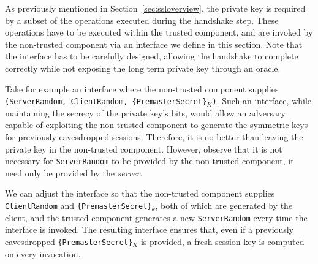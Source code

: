 \documentclass[../../main.tex]{subfiles}
\begin{document}
 As previously mentioned in
Section~\ref{sec:ssloverview}, the private key is required by a subset
of the operations executed during the handshake step. These operations
have to be executed within the trusted component, and are invoked by
the non-trusted component via an interface we define in this
section. Note that the interface has to be carefully designed,
allowing the handshake to complete correctly while not exposing the
long term private key through an oracle.

Take for example an interface where the non-trusted component supplies
\texttt{(ServerRandom, ClientRandom, \{PremasterSecret\}$_K$)}. Such
an interface, while maintaining the secrecy of the private key's bits,
would allow an adversary capable of exploiting the non-trusted
component to generate the symmetric keys for previously eavesdropped
sessions. Therefore, it is no better than leaving the private key in
the non-trusted component.  However, observe that it is not necessary
for \texttt{ServerRandom} to be provided by the non-trusted component,
it need only be provided by the \textit{server}.


We can adjust the interface so that the non-trusted component supplies
\texttt{ClientRandom} and \texttt{\{PremasterSecret\}$_k$}, both of
which are generated by the client, and the trusted component generates
a new \texttt{ServerRandom} every time the interface is invoked. The
resulting interface ensures that, even if a previously eavesdropped
\texttt{\{PremasterSecret\}$_K$} is provided, a fresh session-key is
computed on every invocation.
\end{document}
